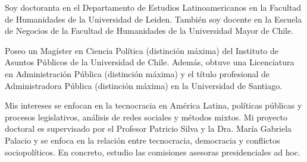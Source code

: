 




\par{Soy doctoranta en el Departamento de Estudios Latinoamericanos en la Facultad de Humanidades de la Universidad de Leiden. También soy docente en la Escuela de Negocios de la Facultad de Humanidades de la Universidad Mayor de Chile. 

Poseo un Magíster en Ciencia Política (distinción máxima) del Instituto de Asuntos Públicos de la Universidad de Chile. Además, obtuve una Licenciatura en Administración Pública (distinción máxima) y el título profesional de Administradora Pública (distinción máxima) en la Universidad de Santiago.

Mis intereses se enfocan en la tecnocracia en América Latina, políticas públicas y procesos legislativos, análisis de redes sociales y métodos mixtos. Mi proyecto doctoral es supervisado por el Profesor Patricio Silva y la Dra. María Gabriela Palacio y se enfoca en la relación entre tecnocracia, democracia y conflictos sociopolíticos. En concreto, estudio las comisiones asesoras presidenciales ad hoc.}\\